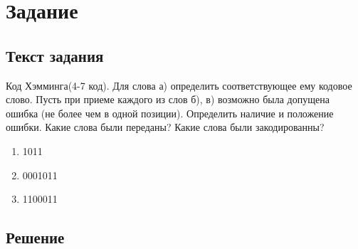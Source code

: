 \documentclass[a4paper, 12pt]{article}
\newcommand{\RNum}[1]{\uppercase\expandafter{\romannumeral #1\relax}}
\begin{document}
\section*{Задание \RNum{4}}
\subsection*{Текст задания} \begin{center} Код Хэмминга(4-7 код). Для слова а) определить соответствующее ему кодовое слово.
Пусть при приеме каждого из слов б), в) возможно была допущена ошибка (не более чем в одной позиции). Определить наличие и положение ошибки.
Какие слова были переданы? Какие слова были закодированны?
\begin{enumerate}[label=\asbuk*),ref=\asbuk*]
    \item 1011
    \item 0001011
    \item 1100011
\end{enumerate}
\end{center}
\subsection*{Решение} 
\end{document}
